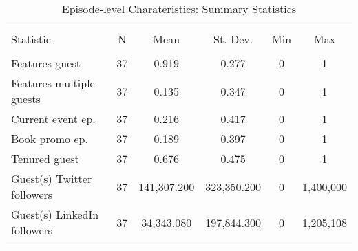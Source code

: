 
\begin{table}[!htbp] \centering 
  \caption{Episode-level Charateristics: Summary Statistics} 
  \label{} 
\begin{tabular}{@{\extracolsep{5pt}}lccccc} 
\\[-1.8ex]\hline 
\hline \\[-1.8ex] 
Statistic & \multicolumn{1}{c}{N} & \multicolumn{1}{c}{Mean} & \multicolumn{1}{c}{St. Dev.} & \multicolumn{1}{c}{Min} & \multicolumn{1}{c}{Max} \\ 
\hline \\[-1.8ex] 
Features guest & 37 & 0.919 & 0.277 & 0 & 1 \\ 
Features multiple guests & 37 & 0.135 & 0.347 & 0 & 1 \\ 
Current event ep. & 37 & 0.216 & 0.417 & 0 & 1 \\ 
Book promo ep. & 37 & 0.189 & 0.397 & 0 & 1 \\ 
Tenured guest & 37 & 0.676 & 0.475 & 0 & 1 \\ 
Guest(s) Twitter followers & 37 & 141,307.200 & 323,350.200 & 0 & 1,400,000 \\ 
Guest(s) LinkedIn followers & 37 & 34,343.080 & 197,844.300 & 0 & 1,205,108 \\ 
\hline \\[-1.8ex] 
\end{tabular} 
\end{table} 
